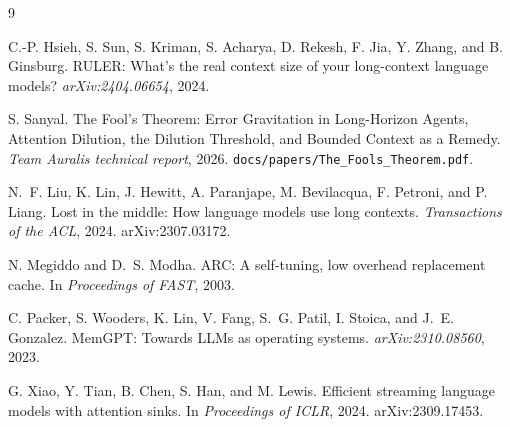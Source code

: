 ﻿\documentclass[11pt,a4paper]{article}
\theoremstyle{plain}
\theoremstyle{definition}
\theoremstyle{remark}
\begin{document}
\begin{thebibliography}{9}

C.-P. Hsieh, S. Sun, S. Kriman, S. Acharya, D. Rekesh, F. Jia, Y. Zhang, and
B. Ginsburg.
\newblock RULER: What's the real context size of your long-context language
  models?
\newblock \emph{arXiv:2404.06654}, 2024.

S. Sanyal.
\newblock The Fool's Theorem: Error Gravitation in Long-Horizon Agents,
  Attention Dilution, the Dilution Threshold, and Bounded Context as a Remedy.
\newblock \emph{Team Auralis technical report}, 2026.
  \texttt{docs/papers/The\_Fools\_Theorem.pdf}.

N.~F. Liu, K. Lin, J. Hewitt, A. Paranjape, M. Bevilacqua, F. Petroni, and
P. Liang.
\newblock Lost in the middle: How language models use long contexts.
\newblock \emph{Transactions of the ACL}, 2024. arXiv:2307.03172.

N. Megiddo and D.~S. Modha.
\newblock ARC: A self-tuning, low overhead replacement cache.
\newblock In \emph{Proceedings of FAST}, 2003.

C. Packer, S. Wooders, K. Lin, V. Fang, S.~G. Patil, I. Stoica, and J.~E.
  Gonzalez.
\newblock MemGPT: Towards LLMs as operating systems.
\newblock \emph{arXiv:2310.08560}, 2023.

G. Xiao, Y. Tian, B. Chen, S. Han, and M. Lewis.
\newblock Efficient streaming language models with attention sinks.
\newblock In \emph{Proceedings of ICLR}, 2024. arXiv:2309.17453.

\end{thebibliography}
\end{document}
